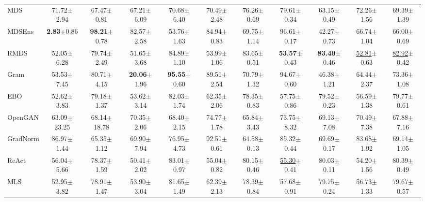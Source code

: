 \documentclass{article} \usepackage{iclr2024_conference,times}
\begin{document}
\begin{table*}[h]
{\begin{tabular}{l cc cc cc cc cc}
			MDS & 71.72{\tiny$\pm$2.94} &  67.47{\tiny$\pm$0.81} &  67.21{\tiny$\pm$6.09} &  70.68{\tiny$\pm$6.40} &  70.49{\tiny$\pm$2.48} &  76.26{\tiny$\pm$0.69} &  79.61{\tiny$\pm$0.34} &  63.15{\tiny$\pm$0.49} &  72.26{\tiny$\pm$1.56} &  69.39{\tiny$\pm$1.39 }\\ 
			MDSEns & \textbf{2.83}{\tiny$\pm$0.86} &  \textbf{98.21}{\tiny$\pm$0.78} &  82.57{\tiny$\pm$2.58} &  53.76{\tiny$\pm$1.63} &  84.94{\tiny$\pm$0.83} &  69.75{\tiny$\pm$1.14} &  96.61{\tiny$\pm$0.17} &  42.27{\tiny$\pm$0.73} &  66.74{\tiny$\pm$1.04} &  66.00{\tiny$\pm$0.69 }\\ 
			RMDS & 52.05{\tiny$\pm$6.28} &  79.74{\tiny$\pm$2.49} &  51.65{\tiny$\pm$3.68} &  84.89{\tiny$\pm$1.10} &  53.99{\tiny$\pm$1.06} &  83.65{\tiny$\pm$0.51} &  \textbf{53.57}{\tiny$\pm$0.43} &  \textbf{83.40}{\tiny$\pm$0.46} &  \underline{52.81}{\tiny$\pm$0.63} &  \underline{82.92}{\tiny$\pm$0.42 }\\ 
			Gram & 53.53{\tiny$\pm$7.45} &  80.71{\tiny$\pm$4.15} &  \textbf{20.06}{\tiny$\pm$1.96} &  \textbf{95.55}{\tiny$\pm$0.60} &  89.51{\tiny$\pm$2.54} &  70.79{\tiny$\pm$1.32} &  94.67{\tiny$\pm$0.60} &  46.38{\tiny$\pm$1.21} &  64.44{\tiny$\pm$2.37} &  73.36{\tiny$\pm$1.08 }\\ 
			EBO & 52.62{\tiny$\pm$3.83} &  79.18{\tiny$\pm$1.37} &  53.62{\tiny$\pm$3.14} &  82.03{\tiny$\pm$1.74} &  62.35{\tiny$\pm$2.06} &  78.35{\tiny$\pm$0.83} &  57.75{\tiny$\pm$0.86} &  79.52{\tiny$\pm$0.23} &  56.59{\tiny$\pm$1.38} &  79.77{\tiny$\pm$0.61 }\\ 
			OpenGAN & 63.09{\tiny$\pm$23.25} &  68.14{\tiny$\pm$18.78} &  70.35{\tiny$\pm$2.06} &  68.40{\tiny$\pm$2.15} &  74.77{\tiny$\pm$1.78} &  65.84{\tiny$\pm$3.43} &  73.75{\tiny$\pm$8.32} &  69.13{\tiny$\pm$7.08} &  70.49{\tiny$\pm$7.38} &  67.88{\tiny$\pm$7.16 }\\ 
			GradNorm & 86.97{\tiny$\pm$1.44} &  65.35{\tiny$\pm$1.12} &  69.90{\tiny$\pm$7.94} &  76.95{\tiny$\pm$4.73} &  92.51{\tiny$\pm$0.61} &  64.58{\tiny$\pm$0.13} &  85.32{\tiny$\pm$0.44} &  69.69{\tiny$\pm$0.17} &  83.68{\tiny$\pm$1.92} &  69.14{\tiny$\pm$1.05 }\\ 
			ReAct & 56.04{\tiny$\pm$5.66} &  78.37{\tiny$\pm$1.59} &  50.41{\tiny$\pm$2.02} &  83.01{\tiny$\pm$0.97} &  55.04{\tiny$\pm$0.82} &  80.15{\tiny$\pm$0.46} &  \underline{55.30}{\tiny$\pm$0.41} &  80.03{\tiny$\pm$0.11} &  54.20{\tiny$\pm$1.56} &  80.39{\tiny$\pm$0.49 }\\ 
			MLS & 52.95{\tiny$\pm$3.82} &  78.91{\tiny$\pm$1.47} &  53.90{\tiny$\pm$3.04} &  81.65{\tiny$\pm$1.49} &  62.39{\tiny$\pm$2.13} &  78.39{\tiny$\pm$0.84} &  57.68{\tiny$\pm$0.91} &  79.75{\tiny$\pm$0.24} &  56.73{\tiny$\pm$1.33} &  79.67{\tiny$\pm$0.57 }\\ 

\end{tabular}}
\end{table*}
\end{document}
